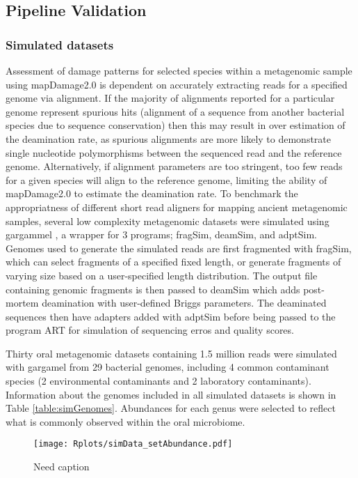 \documentclass[12pt, a4paper]{article}
\begin{document}
\subsection{Pipeline Validation}

\subsubsection{Simulated datasets}

Assessment of damage patterns for selected species within a metagenomic sample using mapDamage2.0 is dependent on accurately extracting reads for a specified genome via alignment. 
If  the majority of alignments reported for a particular genome represent spurious hits (alignment of a sequence from another bacterial species due to sequence conservation) then this may result in over estimation of the deamination rate, as spurious alignments are more likely to demonstrate single nucleotide polymorphisms between the sequenced read and the reference genome. 
Alternatively, if alignment parameters are too stringent, too few reads for a given species will align to the reference genome, limiting the ability of mapDamage2.0 to estimate the deamination rate. 
To benchmark the appropriatness of different short read aligners for mapping ancient metagenomic samples, several low complexity metagenomic datasets were simulated using gargammel \cite{Renaud:2017aa}, a wrapper for 3 programs; fragSim, deamSim, and adptSim. 
Genomes used to generate the simulated reads are first fragmented with fragSim, which can select fragments of a specified fixed length, or generate fragments of varying size based on a user-specified length distribution. 
The output file containing genomic fragments is then passed to deamSim which adds post-mortem deamination with user-defined Briggs parameters. The deaminated sequences then have adapters added with adptSim before being passed to the program ART \cite{Huang:2012aa} for simulation of sequencing erros and quality scores. 

Thirty oral metagenomic datasets containing 1.5 million reads were simulated with gargamel from 29 bacterial genomes, including 4 common contaminant species (2 environmental contaminants and 2 laboratory contaminants). Information about the genomes included in all simulated datasets is shown in Table \ref{table:simGenomes}. Abundances for each genus were selected to reflect what is commonly observed within the oral microbiome.

\begin{figure}[h]
	\texttt{[image: Rplots/simData\_setAbundance.pdf]}
	\caption{Need caption}\label{fig:simDataAbundancesFig}
\end{figure}
\clearpage
\end{document}
